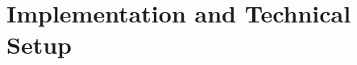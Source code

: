\chapter{Implementation and Technical Setup}\label{chap:implementation}
\thispagestyle{fancy}
\vspace*{0cm} %






% 

